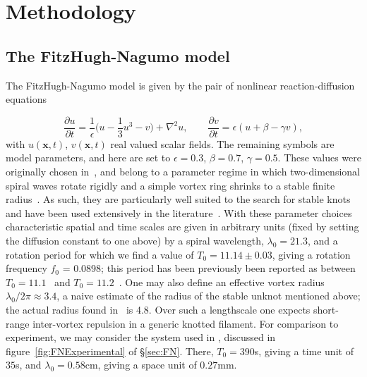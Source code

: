 \section{\label{sec:Methodology} Methodology}

\subsection{The FitzHugh-Nagumo model}
The FitzHugh-Nagumo model is given by the pair of nonlinear reaction-diffusion equations

\begin{equation}
\label{eq:FN}
\frac{\partial u}{ \partial t} = \frac{1}{\epsilon}\biggl(u - \frac{1}{3}u^3 -v\biggr) + \nabla^{2} u,\hspace{2em}    \frac{\partial v}{ \partial t} = {\epsilon}(u + \beta -\gamma v) ,
\end{equation}
with $u(\mathbf{x},t)$, $ v(\mathbf{x},t)$ real valued scalar fields. The remaining symbols are model parameters, and here are set to $\epsilon = 0.3$, $\beta=0.7$, $\gamma = 0.5$. These values were originally chosen in~\citep{Henze1993}, and belong to a parameter regime in which two-dimensional spiral waves rotate rigidly and a simple vortex ring shrinks to a stable finite radius~\citep{Courtemanche1990}. As such, they are particularly well suited to the search for stable knots and have been used extensively in the literature~\citep{Henze1993,WinfreeChapter,Sutcliffe2003,Maucher2016,Maucher2017,Maucher2018,Maucher2019}. With these parameter choices characteristic spatial and time scales are given in arbitrary units (fixed by setting the diffusion constant to one above) by a spiral wavelength, $\lambda_0 = 21.3$, and a rotation period for which we find a value of $T_0=11.14 \pm 0.03$, giving a rotation frequency $f_0$ = 0.0898; this period has been previously been reported as between $T_0 = 11.1$~\citep{Henze1993} and $T_0= 11.2$~\citep{Sutcliffe2003}. One may also define an effective vortex radius $\lambda_0/2\pi \approx 3.4$, a naive estimate of the radius of the stable unknot mentioned above; the actual radius found in~\citep{Courtemanche1990} is 4.8. Over such a lengthscale one expects short-range inter-vortex repulsion in a generic knotted filament. For comparison to experiment, we may consider the system used in \citep{Totz2015}, discussed in figure~\ref{fig:FNExperimental} of \S\ref{sec:FN}. There, $T_0 = 390$s, giving a time unit of $35$s, and $\lambda_0= 0.58$cm, giving a space unit of $0.27$mm.

